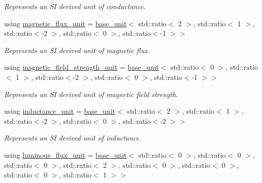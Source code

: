 \begin{DoxyCompactItemize}
\begin{DoxyCompactList}\small\item\em Represents an S\+I derived unit of conductance. \end{DoxyCompactList}\item 
\hypertarget{namespaceunits_1_1category_a869ab7acbc230b4c7bc8df74619d2eaa}{}using \hyperlink{namespaceunits_1_1category_a869ab7acbc230b4c7bc8df74619d2eaa}{magnetic\+\_\+flux\+\_\+unit} = \hyperlink{structunits_1_1base__unit}{base\+\_\+unit}$<$ std\+::ratio$<$ 2 $>$, std\+::ratio$<$ 1 $>$, std\+::ratio$<$-\/2 $>$, std\+::ratio$<$ 0 $>$, std\+::ratio$<$-\/1 $>$$>$\label{namespaceunits_1_1category_a869ab7acbc230b4c7bc8df74619d2eaa}

\begin{DoxyCompactList}\small\item\em Represents an S\+I derived unit of magnetic flux. \end{DoxyCompactList}\item 
\hypertarget{namespaceunits_1_1category_aac428848b9d8c5e6b21457f61096676a}{}using \hyperlink{namespaceunits_1_1category_aac428848b9d8c5e6b21457f61096676a}{magnetic\+\_\+field\+\_\+strength\+\_\+unit} = \hyperlink{structunits_1_1base__unit}{base\+\_\+unit}$<$ std\+::ratio$<$ 0 $>$, std\+::ratio$<$ 1 $>$, std\+::ratio$<$-\/2 $>$, std\+::ratio$<$ 0 $>$, std\+::ratio$<$-\/1 $>$$>$\label{namespaceunits_1_1category_aac428848b9d8c5e6b21457f61096676a}

\begin{DoxyCompactList}\small\item\em Represents an S\+I derived unit of magnetic field strength. \end{DoxyCompactList}\item 
\hypertarget{namespaceunits_1_1category_ad0714439849450c6ad18b82777cb3884}{}using \hyperlink{namespaceunits_1_1category_ad0714439849450c6ad18b82777cb3884}{inductance\+\_\+unit} = \hyperlink{structunits_1_1base__unit}{base\+\_\+unit}$<$ std\+::ratio$<$ 2 $>$, std\+::ratio$<$ 1 $>$, std\+::ratio$<$-\/2 $>$, std\+::ratio$<$ 0 $>$, std\+::ratio$<$-\/2 $>$$>$\label{namespaceunits_1_1category_ad0714439849450c6ad18b82777cb3884}

\begin{DoxyCompactList}\small\item\em Represents an S\+I derived unit of inductance. \end{DoxyCompactList}\item 
\hypertarget{namespaceunits_1_1category_ad6cd329153c512e1aa33f56812660177}{}using \hyperlink{namespaceunits_1_1category_ad6cd329153c512e1aa33f56812660177}{luminous\+\_\+flux\+\_\+unit} = \hyperlink{structunits_1_1base__unit}{base\+\_\+unit}$<$ std\+::ratio$<$ 0 $>$, std\+::ratio$<$ 0 $>$, std\+::ratio$<$ 0 $>$, std\+::ratio$<$ 2 $>$, std\+::ratio$<$ 0 $>$, std\+::ratio$<$ 0 $>$, std\+::ratio$<$ 0 $>$, std\+::ratio$<$ 1 $>$$>$\label{namespaceunits_1_1category_ad6cd329153c512e1aa33f56812660177}


\end{DoxyCompactItemize}
